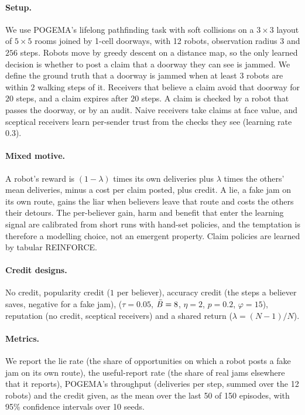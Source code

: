 \paragraph{Setup.}
We use POGEMA's lifelong pathfinding task \citep{skrynnik2025pogema} with soft collisions on a $3\times3$ layout of $5\times5$ rooms joined by 1-cell doorways, with 12 robots, observation radius $3$ and $256$ steps. Robots move by greedy descent on a distance map, so the only learned decision is whether to post a claim that a doorway they can see is jammed. We define the ground truth that a doorway is jammed when at least $3$ robots are within $2$ walking steps of it. Receivers that believe a claim avoid that doorway for $20$ steps, and a claim expires after $20$ steps. A claim is checked by a robot that passes the doorway, or by an audit. Naive receivers take claims at face value, and sceptical receivers learn per-sender trust from the checks they see (learning rate $0.3$).

\paragraph{Mixed motive.}
A robot's reward is $(1-\lambda)$ times its own deliveries plus $\lambda$ times the others' mean deliveries, minus a cost per claim posted, plus credit. A lie, a fake jam on its own route, gains the liar when believers leave that route and costs the others their detours. The per-believer gain, harm and benefit that enter the learning signal are calibrated from short runs with hand-set policies, and the temptation is therefore a modelling choice, not an emergent property. Claim policies are learned by tabular REINFORCE.

\paragraph{Credit designs.}
No credit, popularity credit ($1$ per believer), accuracy credit (the steps a believer saves, negative for a fake jam), \tvc{} ($\tau=0.05$, $\bar B=8$, $\eta=2$, $p=0.2$, $\varphi=15$), reputation (no credit, sceptical receivers) and a shared return ($\lambda=(N-1)/N$).

\paragraph{Metrics.}
We report the lie rate (the share of opportunities on which a robot posts a fake jam on its own route), the useful-report rate (the share of real jams elsewhere that it reports), POGEMA's throughput (deliveries per step, summed over the 12 robots) and the credit given, as the mean over the last 50 of 150 episodes, with 95\% confidence intervals over 10 seeds.

